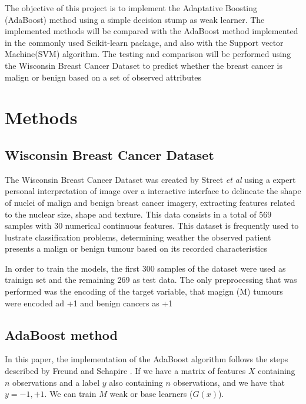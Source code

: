 \documentclass[11pt,twocolumn,letterpaper]{article}
\begin{document}
The objective of this project is to implement the Adaptative Boosting (AdaBoost) method using a simple decision stump as weak learner. The implemented methods will be compared with the AdaBoost method implemented in the commonly used Scikit-learn package, and also with the Support vector Machine(SVM) algorithm. The testing and comparison will be performed using the Wisconsin Breast Cancer Dataset to predict whether the breast cancer is malign or benign based on a set of observed attributes



\section{Methods}

\subsection{Wisconsin Breast Cancer Dataset}

The Wisconsin Breast Cancer Dataset was created by Street \textit{et al} \cite{Street1993} using a expert personal interpretation of image over a interactive interface to delineate the shape of nuclei of malign and benign breast cancer imagery, extracting features related to the nuclear size, shape and texture. This data consists in a total of 569 samples with 30 numerical continuous features. This dataset is frequently used to lustrate classification problems, determining weather the observed patient presents a malign or benign tumour based on its recorded characteristics \cite{afarap2018}

In order to train the models, the first 300 samples of the dataset were used as trainign set and the remaining 269 as test data. The only preprocessing that was performed was the encoding of the target variable, that magign (M) tumours were encoded ad +1 and benign cancers as +1

\subsection{AdaBoost method}

In this paper, the implementation of the AdaBoost algorithm follows the steps described by Freund and Schapire \cite{Freund1999}. If we have a matrix of features $X$ containing $n$ observations and a label $y$ also containing $n$ observations, and we have that $y = {-1,+1}$. We can train $M$ weak or base learners ($G(x)$).
\end{document}
